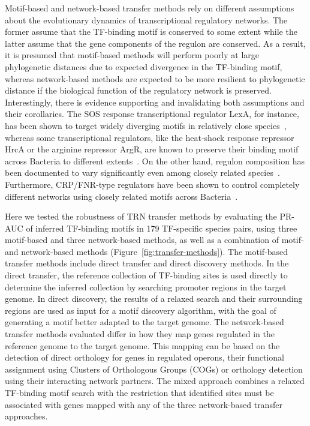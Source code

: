 Motif-based and network-based transfer methods rely on different assumptions
about the evolutionary dynamics of transcriptional regulatory networks. The
former assume that the TF-binding motif is conserved to some extent while the
latter assume that the gene components of the regulon are conserved. As a
result, it is presumed that motif-based methods will perform poorly at large
phylogenetic distances due to expected divergence in the TF-binding motif,
whereas network-based methods are expected to be more resilient to phylogenetic
distance if the biological function of the regulatory network is
preserved. Interestingly, there is evidence supporting and invalidating both
assumptions and their corollaries. The SOS response transcriptional regulator
LexA, for instance, has been shown to target widely diverging motifs in
relatively close species~\citep{erill2007aeons}, whereas some transcriptional
regulators, like the heat-shock response repressor HrcA or the arginine
repressor ArgR, are known to preserve their binding motif across Bacteria to
different extents~\citep{makarova2001conservation, gelfand1999recognition}. On
the other hand, regulon composition has been documented to vary significantly
even among closely related species~\citep{erill2004differences,
  venancio2009reconstructing, baumbach2010power,
  price2007orthologous}. Furthermore, CRP/FNR-type regulators have been shown
to control completely different networks using closely related motifs across
Bacteria~\citep{dufour2010reconstruction, matsui2013comprehensive}.

Here we tested the robustness of TRN transfer methods by evaluating the PR-AUC
of inferred TF-binding motifs in 179 TF-specific species pairs, using three
motif-based and three network-based methods, as well as a combination of motif-
and network-based methods (Figure~\ref{fig:transfer-methods}). The motif-based
transfer methods include direct transfer and direct discovery methods. In the
direct transfer, the reference collection of TF-binding sites is used directly
to determine the inferred collection by searching promoter regions in the
target genome. In direct discovery, the results of a relaxed search and their
surrounding regions are used as input for a motif discovery algorithm, with the
goal of generating a motif better adapted to the target genome. The
network-based transfer methods evaluated differ in how they map genes regulated
in the reference genome to the target genome. This mapping can be based on the
detection of direct orthology for genes in regulated operons, their functional
assignment using Clusters of Orthologous Groups (COGs) or orthology detection
using their interacting network partners. The mixed approach combines a relaxed
TF-binding motif search with the restriction that identified sites must be
associated with genes mapped with any of the three network-based transfer
approaches.

